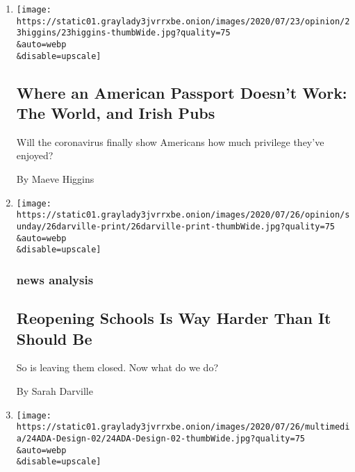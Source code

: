 \begin{enumerate}
\def\labelenumi{\arabic{enumi}.}
\item
  \href{/2020/07/23/opinion/passport-coronavirus-travel.html}{}

  \texttt{[image: https://static01.graylady3jvrrxbe.onion/images/2020/07/23/opinion/23higgins/23higgins-thumbWide.jpg?quality=75\\\&auto=webp\\\&disable=upscale]}

  \hypertarget{where-an-american-passport-doesnt-work-the-world-and-irish-pubs}{%
  \subsection{Where an American Passport Doesn't Work: The World, and
  Irish
  Pubs}\label{where-an-american-passport-doesnt-work-the-world-and-irish-pubs}}

  Will the coronavirus finally show Americans how much privilege they've
  enjoyed?

  By Maeve Higgins
\item
  \href{/2020/07/23/sunday-review/reopening-schools-coronavirus.html}{}

  \texttt{[image: https://static01.graylady3jvrrxbe.onion/images/2020/07/26/opinion/sunday/26darville-print/26darville-print-thumbWide.jpg?quality=75\\\&auto=webp\\\&disable=upscale]}

  \hypertarget{news-analysis}{%
  \subsubsection{news analysis}\label{news-analysis}}

  \hypertarget{reopening-schools-is-way-harder-than-it-should-be}{%
  \subsection{Reopening Schools Is Way Harder Than It Should
  Be}\label{reopening-schools-is-way-harder-than-it-should-be}}

  So is leaving them closed. Now what do we do?

  By Sarah Darville
\item
  \href{/2020/07/20/arts/disabilities-architecture-design.html}{}

  \texttt{[image: https://static01.graylady3jvrrxbe.onion/images/2020/07/26/multimedia/24ADA-Design-02/24ADA-Design-02-thumbWide.jpg?quality=75\\\&auto=webp\\\&disable=upscale]}

  \hypertarget{critics-notebook}{%
}
\end{enumerate}

